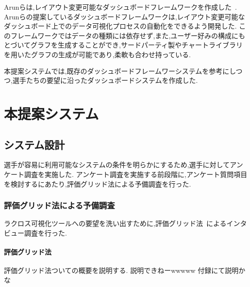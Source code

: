 \documentclass[sotsuron]{kuee}
\begin{document}
	Arunらは,レイアウト変更可能なダッシュボードフレームワークを作成した~\cite{dashboard}.
	Arunらの提案しているダッシュボードフレームワークは,レイアウト変更可能なダッシュボード上でのデータ可視化プロセスの自動化をできるよう開発した.
	このフレームワークではデータの種類には依存せず,また,ユーザー好みの構成にもとづいてグラフを生成することができ,サードパーティ製やチャートライブラリを用いたグラフの生成が可能であり,柔軟も合わせ持っている.
	
	本提案システムでは,既存のダッシュボードフレームワーシステムを参考にしつつ,選手たちの要望に沿ったダッシュボードシステムを作成した.

\chapter{本提案システム}
	\section{システム設計}
		選手が容易に利用可能なシステムの条件を明らかにするため,選手に対してアンケート調査を実施した.
		アンケート調査を実施する前段階に,アンケート質問項目を検討するにあたり,評価グリッド法による予備調査を行った.
		\subsection{評価グリッド法による予備調査}
			ラクロス可視化ツールへの要望を洗い出すために,評価グリッド法~\cite{EGM}によるインタビュー調査を行った.
			\subsubsection{評価グリッド法}
				評価グリッド法ついての概要を説明する.
				説明できねーwwwww
				付録にて説明かな
\end{document}
